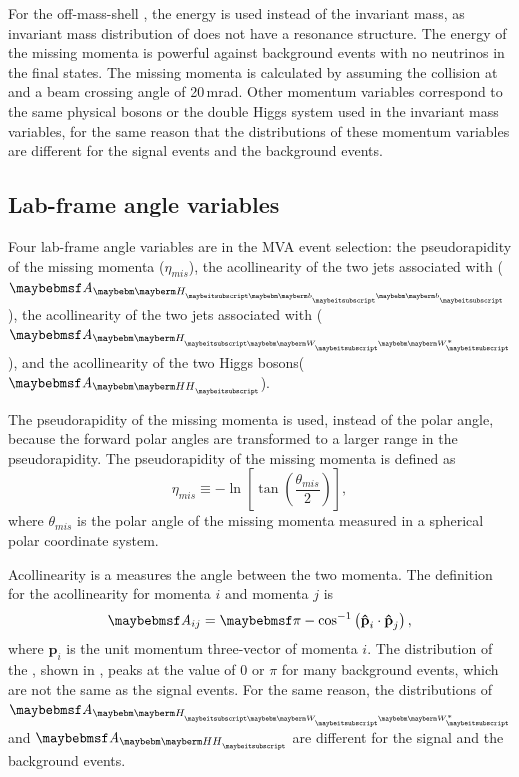 For the off-mass-shell \PW, the energy  is used instead of the invariant mass, as invariant mass distribution of \W* does not have a resonance structure. The energy of the missing momenta is powerful against background events with no neutrinos in the final states. The missing momenta is calculated by assuming the collision at \sqrtS and a beam crossing angle of 20\,mrad. Other momentum variables correspond to the same physical bosons or the double Higgs system used in  the invariant mass  variables, for the same reason that the distributions of these momentum variables are different for the signal events and the background events.


\subsection{Lab-frame angle variables}

Four lab-frame angle variables are in the MVA event selection: the pseudorapidity of the missing momenta ($\eta_{mis}$), the  acollinearity of the two jets associated with \Hbb ($\acolinearity{\Hbb}$),  the  acollinearity of the two jets associated with \HWW ($\acolinearity{\HWW}$), and the  acollinearity of the two Higgs bosons($\acolinearity{\HH}$).

The pseudorapidity   of the missing momenta is used, instead of the polar angle, because the forward polar angles are transformed to a larger range in the pseudorapidity. The pseudorapidity of the missing momenta is defined as
\begin{equation}
\eta_{mis} \equiv  - \ln \left[ \tan \left( \frac{\theta_{mis}}{2} \right) \right],
\end{equation}
where $\theta_{mis}$ is the polar angle of the missing momenta measured in a spherical polar coordinate system.

Acollinearity is a measures the angle between the two momenta. The definition for the acollinearity for momenta $i$ and momenta $j$ is
\begin{equation}
\acolinearity{ij} = \pi - \cos^{-1}\left(\textbf{\^{p}}_i\cdot\textbf{\^{p}}_j\right),
\end{equation}
where $\textbf{\^{p}}_i$ is the unit momentum three-vector of momenta $i$. The distribution of the \acolinearity{\Hbb}, shown in , peaks at the value of 0 or $\pi$ for many background events, which are not the same as the signal events. For the same reason, the distributions of $\acolinearity{\HWW}$ and $\acolinearity{\HH}$ are different for the signal and the background events.

